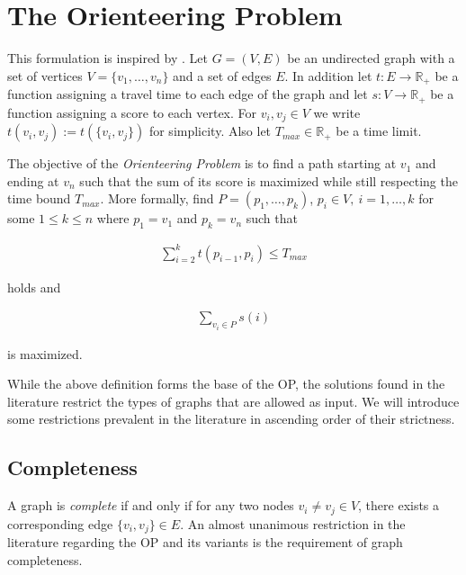 \section{The Orienteering Problem} %
\label{sec:02:problem}

This formulation is inspired by \citeauthor{vansteenwegen_orienteering_2011} \cite{vansteenwegen_orienteering_2011}.
Let $G=(V,E)$ be an undirected graph with a set of vertices $V = \{v_1, \dots, v_n\}$ and a set of edges $E$.
In addition let $t: E \rightarrow \mathbb{R}_+$ be a function assigning a travel time to each edge of the graph and let
$s: V \rightarrow \mathbb{R}_+$ be a function assigning a score to each vertex.
For $v_i, v_j \in V$ we write $t(v_i, v_j) := t(\{v_i, v_j\})$ for simplicity.
Also let $T_{max} \in \mathbb{R}_+$ be a time limit.

The objective of the \emph{Orienteering Problem} is to find a path starting at $v_1$ and ending at $v_n$ 
such that the sum of its score is maximized while still respecting the time bound $T_{max}$.
More formally, find $P = (p_1, \dots, p_k)$, $p_i \in V,\ i=1,\dots, k$ for some $1 \leq k \leq n$ where $p_1 = v_1$ and $p_k = v_n$ such that

\begin{align*}
  \sum_{i = 2}^k t(p_{i-1}, p_i) \leq T_{max}
\end{align*}

holds and

\begin{align*}
  \sum_{v_i \in P} s(i)
\end{align*}

is maximized.

While the above definition forms the base of the OP, the solutions found in the literature restrict the types of graphs that are allowed as input.
We will introduce some restrictions prevalent in the literature in ascending order of their strictness. 

\subsection{Completeness}
\label{subsec:02:complete}

A graph is \emph{complete} if and only if for any two nodes $v_i \neq v_j \in V$, there exists a corresponding edge $\{v_i, v_j\} \in E$.
An almost unanimous \cite{vansteenwegen_orienteering_2011} restriction in the literature regarding the OP and its variants is the requirement of graph completeness. \cite{szwarc_novel_2022,vansteenwegen_orienteering_2011,laporte_selective_1990,santini_hazardous_2022}

